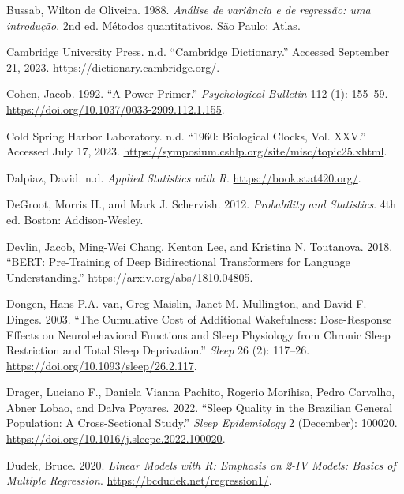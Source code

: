 \documentclass[
  12pt,
  a4paper,
  oneside]{tesesusp}
\newlength{\cslhangindent}
\newlength{\cslentryspacingunit} %
\newenvironment{CSLReferences}[2] %
 {%
  \setlength{\parindent}{0pt}
  \ifodd #1
  \let\oldpar\par
  \def\par{\hangindent=\cslhangindent\oldpar}
  \fi
  \setlength{\parskip}{#2\cslentryspacingunit}
 }%
 {}
\begin{document}
\begin{CSLReferences}{1}{0}
\leavevmode{}%
Bussab, Wilton de Oliveira. 1988. \emph{Análise de variância e de
regressão: uma introdução}. 2nd ed. Métodos quantitativos. São Paulo:
Atlas.

\leavevmode{}%
Cambridge University Press. n.d. {``Cambridge Dictionary.''} Accessed
September 21, 2023. \url{https://dictionary.cambridge.org/}.

\leavevmode{}%
Cohen, Jacob. 1992. {``A Power Primer.''} \emph{Psychological Bulletin}
112 (1): 155--59. \url{https://doi.org/10.1037/0033-2909.112.1.155}.

\leavevmode{}%
Cold Spring Harbor Laboratory. n.d. {``1960: Biological Clocks, Vol.
XXV.''} Accessed July 17, 2023.
\url{https://symposium.cshlp.org/site/misc/topic25.xhtml}.

\leavevmode{}%
Dalpiaz, David. n.d. \emph{Applied Statistics with R}.
\url{https://book.stat420.org/}.

\leavevmode{}%
DeGroot, Morris H., and Mark J. Schervish. 2012. \emph{Probability and
Statistics}. 4th ed. Boston: Addison-Wesley.

\leavevmode{}%
Devlin, Jacob, Ming-Wei Chang, Kenton Lee, and Kristina N. Toutanova.
2018. {``BERT: Pre-Training of Deep Bidirectional Transformers for
Language Understanding.''} \url{https://arxiv.org/abs/1810.04805}.

\leavevmode{}%
Dongen, Hans P.A. van, Greg Maislin, Janet M. Mullington, and David F.
Dinges. 2003. {``The Cumulative Cost of Additional Wakefulness:
Dose-Response Effects on Neurobehavioral Functions and Sleep Physiology
from Chronic Sleep Restriction and Total Sleep Deprivation.''}
\emph{Sleep} 26 (2): 117--26.
\url{https://doi.org/10.1093/sleep/26.2.117}.

\leavevmode{}%
Drager, Luciano F., Daniela Vianna Pachito, Rogerio Morihisa, Pedro
Carvalho, Abner Lobao, and Dalva Poyares. 2022. {``Sleep Quality in the
Brazilian General Population: A Cross-Sectional Study.''} \emph{Sleep
Epidemiology} 2 (December): 100020.
\url{https://doi.org/10.1016/j.sleepe.2022.100020}.

\leavevmode{}%
Dudek, Bruce. 2020. \emph{Linear Models with R: Emphasis on 2-IV Models:
Basics of Multiple Regression}. \url{https://bcdudek.net/regression1/}.


\end{CSLReferences}
\end{document}
